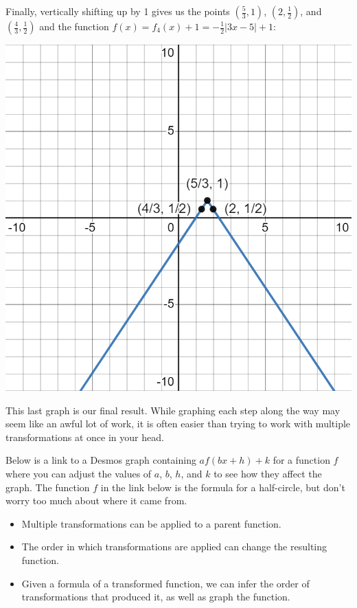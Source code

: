 \documentclass[handout, noauthor, nooutcomes]{ximera}
\begin{document}
\begin{example}
\begin{explanation}
Finally, vertically shifting up by 1 gives us the points $\left(\frac{5}{3}, 1\right)$, $\left(2, \frac{1}{2}\right)$, and $\left(\frac{4}{3}, \frac{1}{2}\right)$ and the function $f(x) = f_4(x)+ 1 = -\frac{1}{2}|3x - 5| + 1$:

\includegraphics[width=1\linewidth]{images/exgraph6.png}

This last graph is our final result. While graphing each step along the way may seem like an awful lot of work, it is often easier than trying to work with multiple transformations at once in your head. 
\end{explanation}
\end{example}

Below is a link to a Desmos graph containing $af(bx + h) + k$ for a function $f$ where you can adjust the values of $a$, $b$, $h$, and $k$ to see how they affect the graph. The function $f$ in the link below is the formula for a half-circle, but don't worry too much about where it came from. 

\begin{center}  
\end{center}




\begin{summary}\begin{itemize}
\item Multiple transformations can be applied to a parent function.
\item The order in which transformations are applied can change the resulting function.
\item Given a formula of a transformed function, we can infer the order of transformations that produced it, as well as graph the function. 
\end{itemize}\end{summary}
\end{document}
